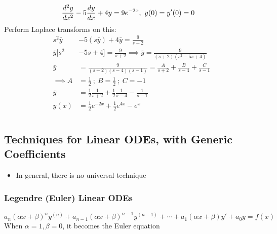 \documentclass[Maths.tex]{subfiles}
\begin{document}
\begin{example}
\begin{align*}
    \frac{d^2 y}{dx^2} &- 5\frac{dy}{dx} + 4y = 9e^{-2x}, ~ y(0) = y'(0) = 0
\end{align*}
Perform Laplace transforms on this:
\begin{align*}
    s^2 \bar{y} &- 5(s\bar{y}) + 4\bar{y} = \frac{9}{s + 2} \\
    \bar{y} [s^2 &- 5s + 4] = \frac{9}{s + 2} \implies \bar{y} = \frac{9}{(s + 2)(s^2 - 5s + 4)} \\
    \bar{y} &= \frac{9}{(s + 2)(s - 4)(s - 1)} = \frac{A}{s + 2} + \frac{B}{s - 4} + \frac{C}{s - 1} \\
    \implies A &= \frac{1}{2} ~;~ B = \frac{1}{2} ~;~ C = -1 \\
    \bar{y} &= \frac{1}{2}\frac{1}{s + 2} + \frac{1}{2}\frac{1}{s - 4} - \frac{1}{s - 1} \\
    y(x) &= \frac{1}{2}e^{-2x} + \frac{1}{2}e^{4x} - e^x
\end{align*}
\end{example}

\chapter{}
\section{Techniques for Linear ODEs, with Generic Coefficients}
\begin{itemize}
    \item In general, there is no universal technique
\end{itemize}

\subsection{Legendre (Euler) Linear ODEs}
\begin{equation*}
    a_n(\alpha x + \beta)^n y^{(n)} + a_{n - 1}(\alpha x + \beta)^{n-1}y^{(n-1)} + \cdots + a_1(\alpha x + \beta)y' + a_0y = f(x) \tag{Legendre}
\end{equation*}
When $\alpha = 1, \beta = 0$, it becomes the Euler equation
\end{document}
